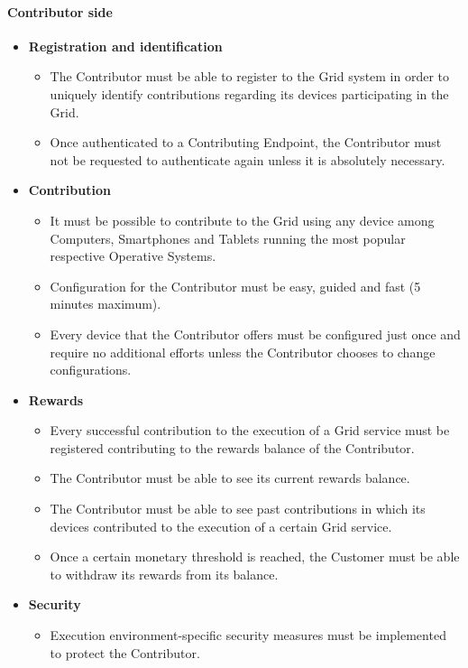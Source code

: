 \paragraph{Contributor side}
\begin{itemize}
    \item \textbf{Registration and identification}
    \begin{itemize}
        \item The Contributor must be able to register to the Grid system in order to uniquely identify contributions regarding its devices participating in the Grid.
        \item Once authenticated to a Contributing Endpoint, the Contributor must not be requested to authenticate again unless it is absolutely necessary.
    \end{itemize}
    \item \textbf{Contribution}
    \begin{itemize}
        \item It must be possible to contribute to the Grid using any device among Computers, Smartphones and Tablets running the most popular respective Operative Systems.
        \item Configuration for the Contributor must be easy, guided and fast (5 minutes maximum).
        \item Every device that the Contributor offers must be configured just once and require no additional efforts unless the Contributor chooses to change configurations.
    \end{itemize}
    \item \textbf{Rewards}
    \begin{itemize}
        \item Every successful contribution to the execution of a Grid service must be registered contributing to the rewards balance of the Contributor.
        \item The Contributor must be able to see its current rewards balance.
        \item The Contributor must be able to see past contributions in which its devices contributed to the execution of a certain Grid service.
        \item Once a certain monetary threshold is reached, the Customer must be able to withdraw its rewards from its balance.
    \end{itemize}
    \item \textbf{Security}
    \begin{itemize}
        \item Execution environment-specific security measures must be implemented to protect the Contributor.

\end{itemize}
\end{itemize}
